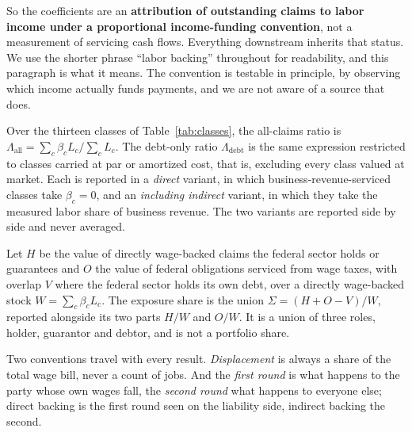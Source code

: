 So the coefficients are an \textbf{attribution of outstanding claims to labor income under a
proportional income-funding convention}, not a measurement of servicing cash flows. Everything
downstream inherits that status. We use the shorter phrase ``labor backing'' throughout for
readability, and this paragraph is what it means. The convention is testable in principle, by
observing which income actually funds payments, and we are not aware of a source that does.

\begin{definition}
\label{def:ratio}
Over the thirteen classes of Table~\ref{tab:classes}, the all-claims ratio is
$\Lambda_{\mathrm{all}} = \sum_c \beta_c L_c / \sum_c L_c$. The debt-only ratio
$\Lambda_{\mathrm{debt}}$ is the same expression restricted to classes carried at par or
amortized cost, that is, excluding every class valued at market. Each is reported in a
\emph{direct} variant, in which business-revenue-serviced classes take $\beta_c = 0$, and an
\emph{including indirect} variant, in which they take the measured labor share of business
revenue. The two variants are reported side by side and never averaged.
\end{definition}

\begin{definition}
\label{def:exposure}
Let $H$ be the value of directly wage-backed claims the federal sector holds or guarantees and
$O$ the value of federal obligations serviced from wage taxes, with overlap $V$ where the federal
sector holds its own debt, over a directly wage-backed stock $W = \sum_c \beta_c L_c$. The
exposure share is the union $\Sigma = (H + O - V)/W$, reported alongside its two parts $H/W$ and
$O/W$. It is a union of three roles, holder, guarantor and debtor, and is not a portfolio share.
\end{definition}

Two conventions travel with every result. \emph{Displacement} is always a share of the total wage
bill, never a count of jobs. And the \emph{first round} is what happens to the party whose own
wages fall, the \emph{second round} what happens to everyone else; direct backing is the first
round seen on the liability side, indirect backing the second.

\begin{table}[htbp]
\centering
\caption{The thirteen claim classes, levels and labor backing, 2025. Household coefficients are
on the adopted wage basis of Section~\ref{sec:accounts}. Classes marked $\dagger$ are serviced
from business revenue and take zero direct backing under the one-step rule. Measured; the
coverage construction of the same coefficients was rebuilt independently.}
\label{tab:classes}

\end{table}

